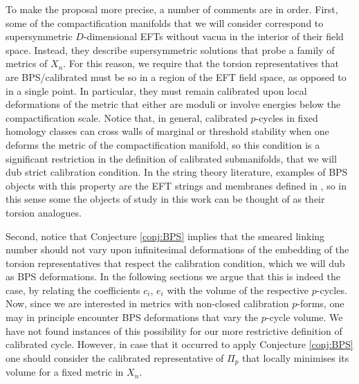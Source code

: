 \documentclass[11pt]{article}
\begin{document}
To make the proposal more precise, a number of comments are in order. First, some of the compactification manifolds that we will consider correspond to supersymmetric $D$-dimensional EFTs without vacua in the interior of their field space. Instead, they describe supersymmetric solutions that probe a family of metrics of $X_n$. For this reason, we require that the torsion representatives that are BPS/calibrated must be so in a region of the EFT field space, as opposed to in a single point. In particular, they must remain calibrated upon local deformations of the metric that either are moduli or involve energies below the compactification scale. Notice that, in general, calibrated $p$-cycles in fixed homology classes can cross walls of marginal or threshold stability when one deforms the metric of the compactification manifold, so this condition is a significant restriction in the definition of calibrated submanifolds, that we will dub strict calibration condition. In the string theory literature, examples of BPS objects with this property are the EFT strings and membranes defined in \cite{Lanza:2020qmt,Lanza:2021udy,Lanza:2022zyg}, so in this sense some the objects of study in this work can be thought of as their torsion analogues. 

Second, notice that Conjecture \ref{conj:BPS} implies that the smeared linking number should not vary upon infinitesimal deformations of the embedding of the torsion representatives that respect the calibration condition, which we will dub as BPS deformations. In the following sections we argue that this is indeed the case, by relating the coefficients $c_i$, $e_i$ with the volume of the respective $p$-cycles. Now, since we are interested in metrics with non-closed calibration $p$-forms, one may in principle encounter BPS deformations that vary the $p$-cycle volume. We have not found instances of this possibility for our more restrictive definition of calibrated cycle. However, in case that it occurred to apply Conjecture \ref{conj:BPS} one should consider the calibrated representative of $\Pi_p$ that locally minimises its volume for a fixed metric in $X_n$. 
\end{document}
